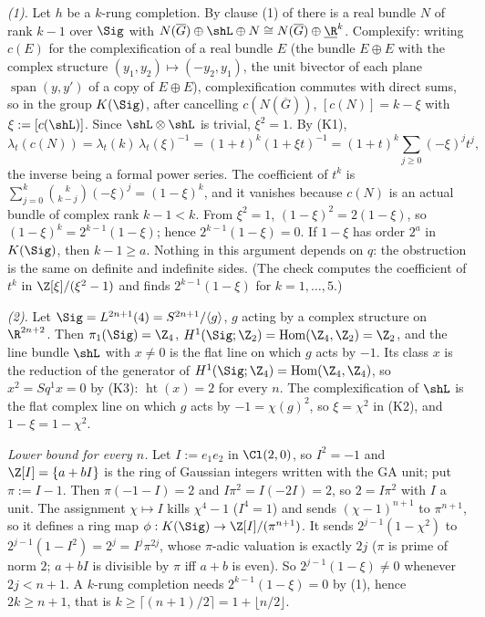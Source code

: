 \emph{(1).} Let $h$ be a $k$-rung completion. By clause (1) of  there is a real bundle $N$ of rank $k - 1$ over $\Sig$ with $N(\overline G) \oplus \shL \oplus N \cong N(\overline G) \oplus \underline{\R}^{k}$. Complexify: writing $c(E)$ for the complexification of a real bundle $E$ (the bundle $E \oplus E$ with the complex structure $(y_1, y_2) \mapsto (-y_2, y_1)$, the unit bivector of each plane $\operatorname{span}(y, y')$ of a copy of $E \oplus E$), complexification commutes with direct sums, so in the group $K(\Sig)$, after cancelling $c(N(\overline G))$, $[c(N)] = k - \xi$ with $\xi := [c(\shL)]$. Since $\shL \otimes \shL$ is trivial, $\xi^{2} = 1$. By (K1),
\[
\lambda_t(c(N)) = \lambda_t(k)\,\lambda_t(\xi)^{-1} = (1+t)^{k}(1 + \xi t)^{-1} = (1+t)^{k} \sum_{j \geq 0} (-\xi)^{j} t^{j},
\]
the inverse being a formal power series. The coefficient of $t^{k}$ is $\sum_{j=0}^{k} \binom{k}{k-j}(-\xi)^{j} = (1 - \xi)^{k}$, and it vanishes because $c(N)$ is an actual bundle of complex rank $k - 1 < k$. From $\xi^{2} = 1$, $(1-\xi)^{2} = 2(1 - \xi)$, so $(1-\xi)^{k} = 2^{k-1}(1-\xi)$; hence $2^{k-1}(1-\xi) = 0$. If $1 - \xi$ has order $2^{a}$ in $K(\Sig)$, then $k - 1 \geq a$. Nothing in this argument depends on $q$: the obstruction is the same on definite and indefinite sides. (The check computes the coefficient of $t^{k}$ in $\Z[\xi]/(\xi^{2} - 1)$ and finds $2^{k-1}(1-\xi)$ for $k = 1, \dots, 5$.)

\emph{(2).} Let $\Sig = L^{2n+1}(4) = S^{2n+1}/\langle g \rangle$, $g$ acting by a complex structure on $\R^{2n+2}$. Then $\pi_1(\Sig) = \Z_{4}$, $H^{1}(\Sig; \Z_{2}) = \operatorname{Hom}(\Z_{4}, \Z_{2}) = \Z_{2}$, and the line bundle $\shL$ with $x \neq 0$ is the flat line on which $g$ acts by $-1$. Its class $x$ is the reduction of the generator of $H^{1}(\Sig; \Z_{4}) = \operatorname{Hom}(\Z_{4}, \Z_{4})$, so $x^{2} = Sq^{1}x = 0$ by (K3): $\operatorname{ht}(x) = 2$ for every $n$. The complexification of $\shL$ is the flat complex line on which $g$ acts by $-1 = \chi(g)^{2}$, so $\xi = \chi^{2}$ in (K2), and $1 - \xi = 1 - \chi^{2}$.

\emph{Lower bound for every $n$.} Let $I := e_1 e_2$ in $\Cl(2,0)$, so $I^{2} = -1$ and $\Z[I] = \{a + bI\}$ is the ring of Gaussian integers written with the GA unit; put $\pi := I - 1$. Then $\pi(-1 - I) = 2$ and $I\pi^{2} = I(-2I) = 2$, so $2 = I \pi^{2}$ with $I$ a unit. The assignment $\chi \mapsto I$ kills $\chi^{4} - 1$ ($I^{4} = 1$) and sends $(\chi - 1)^{n+1}$ to $\pi^{n+1}$, so it defines a ring map $\phi : K(\Sig) \to \Z[I]/(\pi^{n+1})$. It sends $2^{j-1}(1 - \chi^{2})$ to $2^{j-1}(1 - I^{2}) = 2^{j} = I^{j}\pi^{2j}$, whose $\pi$-adic valuation is exactly $2j$ ($\pi$ is prime of norm $2$; $a + bI$ is divisible by $\pi$ iff $a + b$ is even). So $2^{j-1}(1 - \xi) \neq 0$ whenever $2j < n + 1$. A $k$-rung completion needs $2^{k-1}(1-\xi) = 0$ by (1), hence $2k \geq n + 1$, that is $k \geq \lceil (n+1)/2 \rceil = 1 + \lfloor n/2 \rfloor$.

